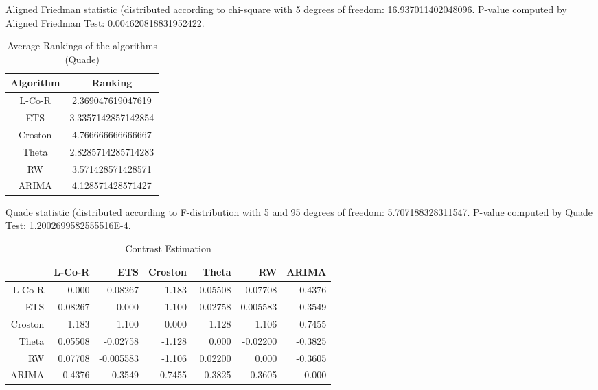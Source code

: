 \documentclass[a4paper,10pt]{article}
\begin{document}
\begin{landscape}
Aligned Friedman statistic (distributed according to chi-square with 5 degrees of freedom: 16.937011402048096. 
P-value computed by Aligned Friedman Test: 0.004620818831952422.\newline


\newpage

\begin{table}[!htp]
\centering
\caption{Average Rankings of the algorithms (Quade)
}\begin{tabular}{c|c}
Algorithm&Ranking\\
\hline
L-Co-R&2.369047619047619\\
ETS&3.3357142857142854\\
Croston&4.766666666666667\\
Theta&2.8285714285714283\\
RW&3.571428571428571\\
ARIMA&4.128571428571427\\
\end{tabular}
\end{table}
Quade statistic (distributed according to F-distribution with 5 and 95 degrees of freedom: 5.707188328311547. 
P-value computed by Quade Test: 1.2002699582555516E-4.\newline


\newpage

\begin{table}[!htp]
\centering\tiny
\caption{Contrast Estimation}
\begin{tabular}{
|r|r|r|r|r|r|r|}
\hline
 &L-Co-R&ETS&Croston&Theta&RW&ARIMA\\
\hline
L-Co-R&0.000&-0.08267&-1.183&-0.05508&-0.07708&-0.4376\\
\hline
ETS&0.08267&0.000&-1.100&0.02758&0.005583&-0.3549\\
\hline
Croston&1.183&1.100&0.000&1.128&1.106&0.7455\\
\hline
Theta&0.05508&-0.02758&-1.128&0.000&-0.02200&-0.3825\\
\hline
RW&0.07708&-0.005583&-1.106&0.02200&0.000&-0.3605\\
\hline
ARIMA&0.4376&0.3549&-0.7455&0.3825&0.3605&0.000\\
\hline

\end{tabular}
\end{table}

\newpage


\end{landscape}
\end{document}
